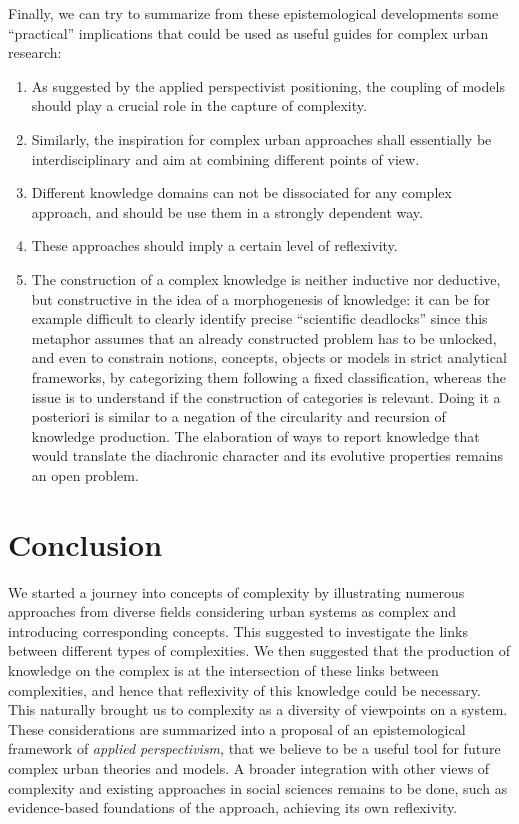 Finally, we can try to summarize from these epistemological developments some  ``practical'' implications that could be used as useful guides for complex urban research:

\begin{enumerate}
	\item As suggested by the applied perspectivist positioning, the coupling of models should play a crucial role in the capture of complexity.
	\item Similarly, the inspiration for complex urban approaches shall essentially be interdisciplinary and aim at combining different points of view.
	\item Different knowledge domains can not be dissociated for any complex approach, and should be use them in a strongly dependent way.
	\item These approaches should imply a certain level of reflexivity.
	\item The construction of a complex knowledge \cite{morin1991methode} is neither inductive nor deductive, but constructive in the idea of a morphogenesis of knowledge: it can be for example difficult to clearly identify precise ``scientific deadlocks'' since this metaphor assumes that an already constructed problem has to be unlocked, and even to constrain notions, concepts, objects or models in strict analytical frameworks, by categorizing them following a fixed classification, whereas the issue is to understand if the construction of categories is relevant. Doing it a posteriori is similar to a negation of the circularity and recursion of knowledge production. The elaboration of ways to report knowledge that would translate the diachronic character and its evolutive properties remains an open problem.
\end{enumerate}




\section*{Conclusion}

We started a journey into concepts of complexity by illustrating numerous approaches from diverse fields considering urban systems as complex and introducing corresponding concepts. This suggested to investigate the links between different types of complexities. We then suggested that the production of knowledge on the complex is at the intersection of these links between complexities, and hence that reflexivity of this knowledge could be necessary. This naturally brought us to complexity as a diversity of viewpoints on a system. These considerations are summarized into a proposal of an epistemological framework of \emph{applied perspectivism}, that we believe to be a useful tool for future complex urban theories and models. A broader integration with other views of complexity and existing approaches in social sciences remains to be done, such as evidence-based foundations of the approach, achieving its own reflexivity.






